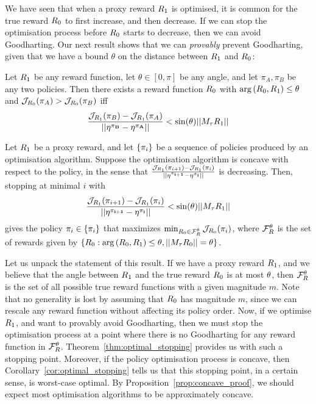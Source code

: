 We have seen that when a proxy reward $R_1$ is optimised, it is common for the true reward $R_0$ to first increase, and then decrease. 
If we can stop the optimisation process before $R_0$ starts to decrease, then we can avoid Goodharting.
Our next result shows that we can \emph{provably} prevent Goodharting, given that we have a bound $\theta$ on the distance between $R_1$ and $R_0$:

\begin{theorem}\label{thm:optimal_stopping}
Let $R_1$ be any reward function, let $\theta \in [0,\pi]$ be any angle, and let $\pi_A, \pi_B$ be any two policies. Then there exists a reward function $R_0$ with $\mathrm{arg}\left({R_0}, {R_1}\right) \leq \theta$ and $\mathcal{J}_{R_0}(\pi_A) > \mathcal{J}_{R_0}(\pi_B)$ iff
$$
\frac{\mathcal{J}_{R_1}(\pi_B)-\mathcal{J}_{R_1}(\pi_A)}{||\mathbf{\eta^{\pi_B}}-\mathbf{\eta^{\pi_A}}||} < \sin(\theta)||M_\tau R_1||
$$
\end{theorem}
\begin{corollary}\label{cor:optimal_stopping}
Let $R_1$ be a proxy reward, and let $\{\pi_i\}$ be a sequence of policies produced by an optimisation algorithm. Suppose the optimisation algorithm is concave with respect to the policy, in the sense that $\frac{\mathcal{J}_{R_1}(\pi_{i+1})-\mathcal{J}_{R_1}(\pi_{i})}{||\mathbf{\eta^{\pi_{i+1}}}-\mathbf{\eta^{\pi_{i}}}||}$ is decreasing.
Then, stopping at minimal $i$ with 
$$
\frac{\mathcal{J}_{R_1}(\pi_{i+1})-\mathcal{J}_{R_1}(\pi_{i})}{||\mathbf{\eta^{\pi_{i+1}}}-\mathbf{\eta^{\pi_{i}}}||} < \sin(\theta)||M_\tau R_1||
$$
gives the policy $\pi_i \in \{\pi_i\}$ that maximizes 
$\min_{R_0 \in \mathcal{F}_{R}^\theta}\mathcal{J}_{R_0}(\pi_i)$,
where $\mathcal{F}_{R}^\theta$ is the set of rewards given by $\{R_0:\mathrm{arg}\left({R_0}, {R_1}\right)\leq \theta, ||M_\tau R_0|| = \theta\}$.
\end{corollary}

Let us unpack the statement of this result. 
If we have a proxy reward $R_1$, and we believe that the angle between $R_1$ and the true reward $R_0$ is at most $\theta$, then $\mathcal{F}_{R}^\theta$ is the set of all possible true reward functions with a given magnitude $m$. 
Note that no generality is lost by assuming that $R_0$ has magnitude $m$, since we can rescale any reward function without affecting its policy order.
Now, if we optimise $R_1$, and want to provably avoid Goodharting, then we must stop the optimisation process at a point where there is no Goodharting for any reward function in $\mathcal{F}_{R}^\theta$.
Theorem~\ref{thm:optimal_stopping} provides us with such a stopping point. Moreover, if the policy optimisation process is concave, then Corollary~\ref{cor:optimal_stopping} tells us that this stopping point, in a certain sense, is worst-case optimal.
By Proposition~\ref{prop:concave_proof}, we should expect most optimisation algorithms to be approximately concave. 


